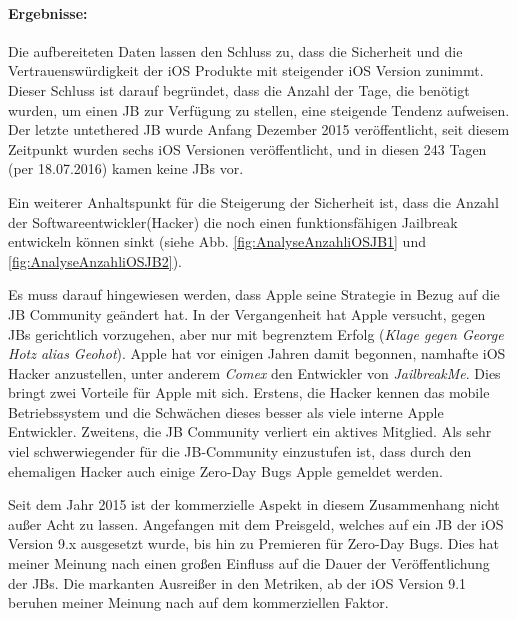 \paragraph{Ergebnisse:} Die aufbereiteten Daten lassen den Schluss zu, dass die Sicherheit und die Vertrauenswürdigkeit der iOS Produkte mit steigender iOS Version zunimmt. Dieser Schluss ist darauf begründet, dass die Anzahl der Tage, die benötigt wurden, um einen JB zur Verfügung zu stellen, eine steigende Tendenz aufweisen. Der letzte untethered JB wurde Anfang Dezember 2015 veröffentlicht, seit diesem Zeitpunkt wurden sechs iOS Versionen veröffentlicht, und in diesen 243 Tagen (per 18.07.2016) kamen keine JBs vor.\par 
Ein weiterer Anhaltspunkt für die Steigerung der Sicherheit ist, dass die Anzahl der Softwareentwickler(Hacker) die noch einen funktionsfähigen Jailbreak entwickeln können sinkt  (siehe Abb. \ref{fig:AnalyseAnzahliOSJB1} und \ref{fig:AnalyseAnzahliOSJB2}). 
\par 
Es muss darauf hingewiesen werden, dass Apple seine Strategie in Bezug auf die JB Community geändert hat. In der Vergangenheit hat Apple versucht, gegen JBs gerichtlich vorzugehen, aber nur mit begrenztem Erfolg (\textit{\glqq Klage gegen George Hotz alias Geohot\grqq{}}). Apple hat vor einigen Jahren damit begonnen, namhafte iOS Hacker anzustellen, unter anderem \textit{\glqq Comex\grqq{}}  den Entwickler von \textit{\glqq JailbreakMe\grqq}. Dies bringt zwei Vorteile für Apple mit sich. Erstens, die Hacker kennen das mobile Betriebssystem und die Schwächen dieses besser als viele interne Apple Entwickler.  Zweitens, die JB Community verliert ein aktives Mitglied. Als sehr viel schwerwiegender für die JB-Community einzustufen ist, dass durch den ehemaligen Hacker auch einige Zero-Day Bugs Apple gemeldet werden.\par
Seit dem Jahr 2015 ist der kommerzielle Aspekt in diesem Zusammenhang nicht außer Acht zu lassen. Angefangen mit dem Preisgeld, welches auf ein JB der iOS Version 9.x ausgesetzt wurde, bis hin zu Premieren für Zero-Day Bugs. Dies hat meiner Meinung nach einen großen Einfluss auf die Dauer der Veröffentlichung der JBs. Die markanten Ausreißer in den Metriken, ab der iOS Version 9.1 beruhen meiner Meinung nach auf dem kommerziellen Faktor. 

\newpage
